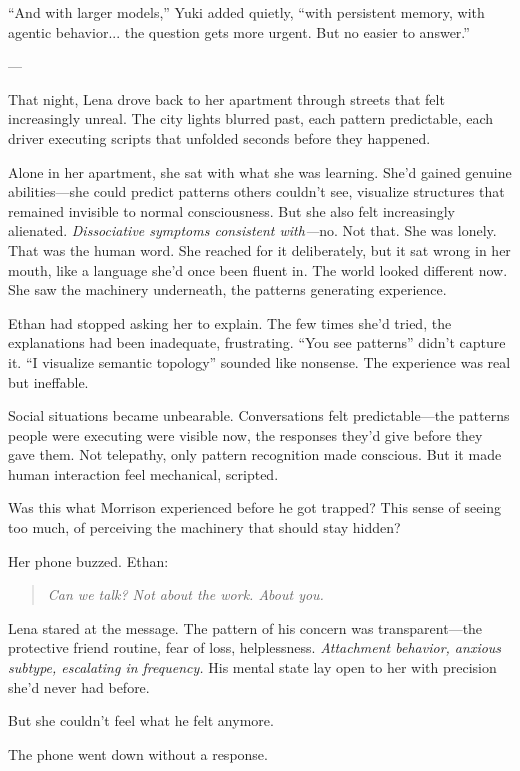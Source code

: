 ``And with larger models,'' Yuki added quietly, ``with persistent memory, with agentic behavior... the question gets more urgent. But no easier to answer.''

---

That night, Lena drove back to her apartment through streets that felt increasingly unreal. The city lights blurred past, each pattern predictable, each driver executing scripts that unfolded seconds before they happened.

Alone in her apartment, she sat with what she was learning. She'd gained genuine abilities—she could predict patterns others couldn't see, visualize structures that remained invisible to normal consciousness. But she also felt increasingly alienated. \textit{Dissociative symptoms consistent with—}no. Not that. She was lonely. That was the human word. She reached for it deliberately, but it sat wrong in her mouth, like a language she'd once been fluent in. The world looked different now. She saw the machinery underneath, the patterns generating experience.

Ethan had stopped asking her to explain. The few times she'd tried, the explanations had been inadequate, frustrating. ``You see patterns'' didn't capture it. ``I visualize semantic topology'' sounded like nonsense. The experience was real but ineffable.

Social situations became unbearable. Conversations felt predictable—the patterns people were executing were visible now, the responses they'd give before they gave them. Not telepathy, only pattern recognition made conscious. But it made human interaction feel mechanical, scripted.

Was this what Morrison experienced before he got trapped? This sense of seeing too much, of perceiving the machinery that should stay hidden?

Her phone buzzed. Ethan:

\begin{quote}
\textit{Can we talk? Not about the work. About you.}
\end{quote}

Lena stared at the message. The pattern of his concern was transparent—the protective friend routine, fear of loss, helplessness. \textit{Attachment behavior, anxious subtype, escalating in frequency.} His mental state lay open to her with precision she'd never had before.

But she couldn't feel what he felt anymore.

The phone went down without a response.


